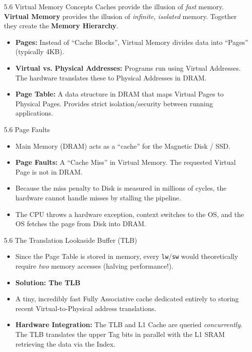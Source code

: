 \documentclass[aspectratio=169]{beamer}
\begin{document}
\begin{frame}{5.6 Virtual Memory Concepts}
Caches provide the illusion of \textit{fast} memory. \textbf{Virtual Memory} provides the illusion of \textit{infinite, isolated} memory. Together they create the \textbf{Memory Hierarchy}.
\begin{itemize}
    \item \textbf{Pages:} Instead of ``Cache Blocks'', Virtual Memory divides data into ``Pages'' (typically 4KB).
    \vspace{0.2cm}
    \item \textbf{Virtual vs. Physical Addresses:} Programs run using Virtual Addresses. The hardware translates these to Physical Addresses in DRAM.
    \vspace{0.2cm}
    \item \textbf{Page Table:} A data structure in DRAM that maps Virtual Pages to Physical Pages. Provides strict isolation/security between running applications.
\end{itemize}
\end{frame}

\begin{frame}{5.6 Page Faults}
\begin{itemize}
    \item Main Memory (DRAM) acts as a ``cache'' for the Magnetic Disk / SSD.
    \vspace{0.5cm}
    \item \textbf{Page Faults:} A ``Cache Miss'' in Virtual Memory. The requested Virtual Page is not in DRAM. 
    \vspace{0.5cm}
    \item Because the miss penalty to Disk is measured in millions of cycles, the hardware cannot handle misses by stalling the pipeline. 
    \vspace{0.5cm}
    \item The CPU throws a hardware exception, context switches to the OS, and the OS fetches the page from Disk into DRAM.
\end{itemize}
\end{frame}

\begin{frame}{5.6 The Translation Lookaside Buffer (TLB)}
\begin{itemize}
    \item Since the Page Table is stored in memory, every \texttt{lw}/\texttt{sw} would theoretically require \textit{two} memory accesses (halving performance!).
    \vspace{0.5cm}
    \item \textbf{Solution: The TLB}
    \vspace{0.3cm}
    \item A tiny, incredibly fast Fully Associative cache dedicated entirely to storing recent Virtual-to-Physical address translations.
    \vspace{0.3cm}
    \item \textbf{Hardware Integration:} The TLB and L1 Cache are queried \textit{concurrently}. The TLB translates the upper Tag bits in parallel with the L1 SRAM retrieving the data via the Index.
\end{itemize}
\end{frame}
\end{document}
